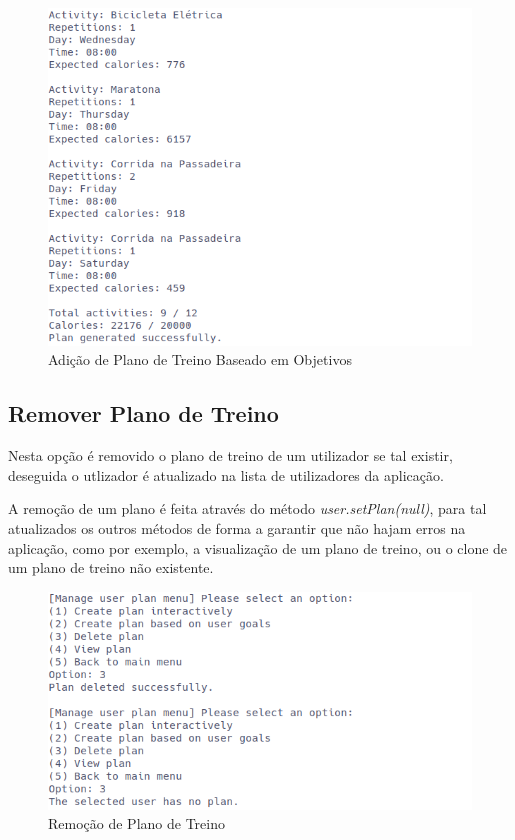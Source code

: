 \documentclass[a4paper,12pt]{scrreprt}
\begin{document}
    \begin{figure}[!ht]
        \centering
        \includegraphics[width=\textwidth]{images/createPlanGoals2.png}
        \caption{Adição de Plano de Treino Baseado em Objetivos}
        \label{fig:add-plan-goals-2}
    \end{figure}

    \clearpage
    \subsection{Remover Plano de Treino}
    Nesta opção é removido o plano de treino de um utilizador se tal existir,
    deseguida o utlizador é atualizado na lista de utilizadores da aplicação.

    A remoção de um plano é feita através do método \textit{user.setPlan(null)},
    para tal atualizados os outros métodos de forma a garantir que não hajam
    erros na aplicação, como por exemplo, a visualização de um plano de treino,
    ou o clone de um plano de treino não existente.

    \begin{figure}[!ht]
        \centering
        \includegraphics[width=\textwidth]{images/deletePlan.png}
        \caption{Remoção de Plano de Treino}
        \label{fig:remove-plan}
    \end{figure}
\end{document}
